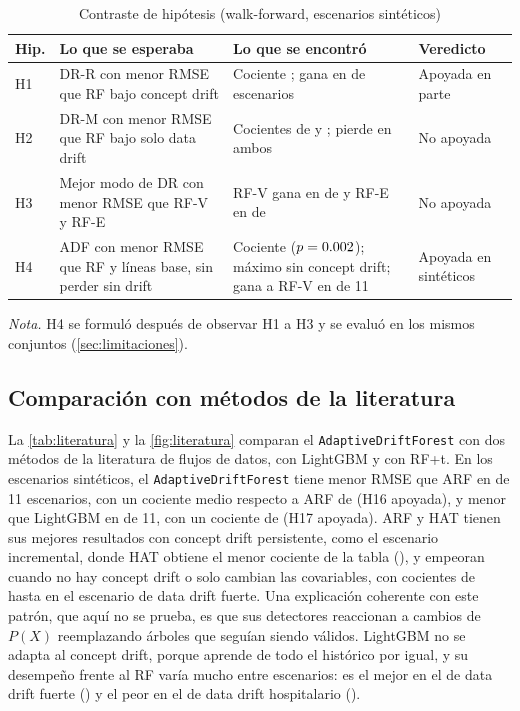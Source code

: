 \documentclass[11pt,a4paper]{article}
\newcommand{\nota}[1]{\par\smallskip\raggedright\footnotesize\textit{Nota.} #1}
\begin{document}
\begin{table}[htbp]
  \centering
  \caption{Contraste de hipótesis (walk-forward, escenarios sintéticos)}\label{tab:veredictos}
  \small
  \begin{tabularx}{\textwidth}{l X X l}
    \toprule
    Hip. & Lo que se esperaba & Lo que se encontró & Veredicto \\
    \midrule
    H1 & DR-R con menor RMSE que RF bajo concept drift &
      Cociente \hUnoGeo{}; gana en \hUnoGana{} de \nConcept{} escenarios & Apoyada en parte \\
    H2 & DR-M con menor RMSE que RF bajo solo data drift &
      Cocientes de \hDosMin{} y \hDosMax{}; pierde en ambos & No apoyada \\
    H3 & Mejor modo de DR con menor RMSE que RF-V y RF-E &
      RF-V gana en \hTresRFV{} de \hTresN{} y RF-E en \hTresRFE{} de \hTresN{} & No apoyada \\
    H4 & ADF con menor RMSE que RF y líneas base, sin perder sin drift &
      Cociente \rADFeSintWalk{} ($p=0.002$); máximo \hCuatroSinMax{} sin concept drift; gana a
      RF-V en \hCuatroVsRFV{} de 11 & Apoyada en sintéticos \\
    \bottomrule
  \end{tabularx}
  \nota{H4 se formuló después de observar H1 a H3 y se evaluó en los mismos conjuntos (\cref{sec:limitaciones}).}
\end{table}


\subsection{Comparación con métodos de la literatura}\label{sec:res-lit}

La \cref{tab:literatura} y la \cref{fig:literatura} comparan el \texttt{AdaptiveDriftForest} con dos
métodos de la literatura de flujos de datos, con LightGBM y con RF+t. En los escenarios sintéticos, el
\texttt{AdaptiveDriftForest} tiene menor RMSE que ARF en \VadfVsARFGana{} de 11 escenarios, con un
cociente medio respecto a ARF de \VadfVsARFGeo{} (H16 apoyada), y menor que LightGBM en \VadfVsLGBMGana{}
de 11, con un cociente de \VadfVsLGBMGeo{} (H17 apoyada). ARF y HAT tienen sus mejores resultados con
concept drift persistente, como el escenario incremental, donde HAT obtiene el menor cociente de la tabla
(\VlitHatIncr), y empeoran cuando no hay concept drift o solo cambian las covariables, con cocientes de
hasta \VlitArfCov{} en el escenario de data drift fuerte. Una explicación coherente con este patrón, que
aquí no se prueba, es que sus detectores reaccionan a cambios de $P(X)$ reemplazando árboles que seguían
siendo válidos. LightGBM no se adapta al concept drift, porque aprende de todo el histórico por igual, y
su desempeño frente al RF varía mucho entre escenarios: es el mejor en el de data drift fuerte
(\VlitLgbmCov) y el peor en el de data drift hospitalario (\VlitLgbmHospData).
\end{document}
